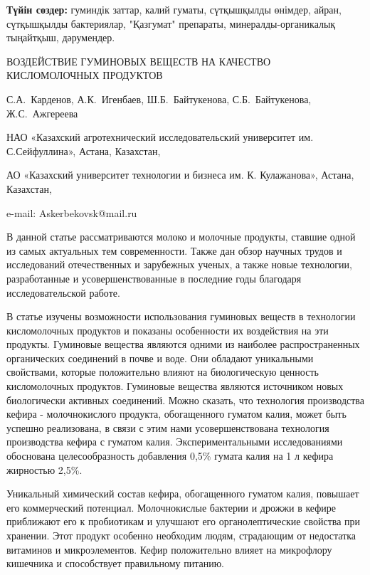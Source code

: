 {\bfseries Түйін сөздер:} гуминдік заттар, калий гуматы, сүтқышқылды
өнімдер, айран, сүтқышқылды бактериялар, "Қазгумат" препараты,
минералды-органикалық тыңайтқыш, дәрумендер.

\begin{header}
ВОЗДЕЙСТВИЕ ГУМИНОВЫХ ВЕЩЕСТВ НА КАЧЕСТВО КИСЛОМОЛОЧНЫХ ПРОДУКТОВ

С.А.~Карденов\envelope,
А.К.~Игенбаев,
Ш.Б.~Байтукенова,
С.Б.~Байтукенова,
Ж.С.~Ажгереева
\end{header}

\begin{affil}
НАО «Казахский агротехнический исследовательский университет им. С.Сейфуллина», Астана, Казахстан,

АО «Казахский университет технологии и бизнеса им. К. Кулажанова», Астана, Казахстан,

e-mail: Askerbekovsk@mail.ru
\end{affil}

В данной статье рассматриваются молоко и молочные продукты, ставшие
одной из самых актуальных тем современности. Также дан обзор научных
трудов и исследований отечественных и зарубежных ученых, а также новые
технологии, разработанные и усовершенствованные в последние годы
благодаря исследовательской работе.

В статье изучены возможности использования гуминовых веществ в
технологии кисломолочных продуктов и показаны особенности их воздействия
на эти продукты. Гуминовые вещества являются одними из наиболее
распространенных органических соединений в почве и воде. Они обладают
уникальными свойствами, которые положительно влияют на биологическую
ценность кисломолочных продуктов. Гуминовые вещества являются источником
новых биологически активных соединений. Можно сказать, что технология
производства кефира - молочнокислого продукта, обогащенного гуматом
калия, может быть успешно реализована, в связи с этим нами
усовершенствована технология производства кефира с гуматом калия.
Экспериментальными исследованиями обоснована целесообразность добавления
0,5\% гумата калия на 1 л кефира жирностью 2,5\%.

Уникальный химический состав кефира, обогащенного гуматом калия,
повышает его коммерческий потенциал. Молочнокислые бактерии и дрожжи в
кефире приближают его к пробиотикам и улучшают его органолептические
свойства при хранении. Этот продукт особенно необходим людям, страдающим
от недостатка витаминов и микроэлементов. Кефир положительно влияет на
микрофлору кишечника и способствует правильному питанию.

